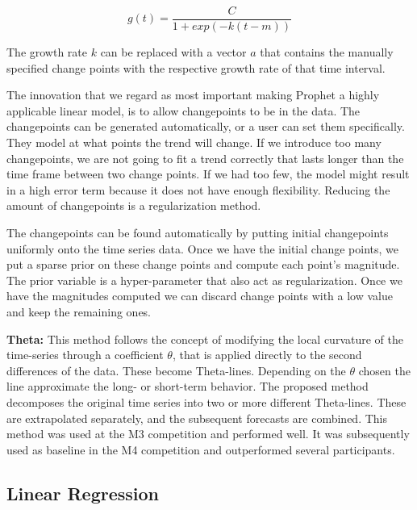 \begin{equation}
    g(t)=\dfrac{C}{1+exp(-k(t-m))}
    \label{eq:simpleTrendModel}
\end{equation}

The growth rate $k$ can be replaced with a vector $a$ that contains the manually specified change points with the respective growth rate of that time interval.

The innovation that we regard as most important making Prophet a highly applicable linear model, is to allow changepoints to be in the data. The changepoints can be generated automatically, or a user can set them specifically. They model at what points the trend will change. If we introduce too many changepoints, we are not going to fit a trend correctly that lasts longer than the time frame between two change points. If we had too few, the model might result in a high error term because it does not have enough flexibility. Reducing the amount of changepoints is a regularization method.

The changepoints can be found automatically by putting initial changepoints uniformly onto the time series data. Once we have the initial change points, we put a sparse prior on these change points and compute each point's magnitude. The prior variable is a hyper-parameter that also act as regularization. Once we have the magnitudes computed we can discard change points with a low value and keep the remaining ones.

\textbf{Theta:} \cite{THETA} This method follows the concept of modifying the local curvature of the time-series through a coefficient $\theta$, that is applied directly to the second differences of the data. These become Theta-lines. Depending on the $\theta$ chosen the line approximate the long- or short-term behavior. The proposed method decomposes the original time series into two or more different Theta-lines. These are extrapolated separately, and the subsequent forecasts are combined. This method was used at the M3 competition and performed well. It was subsequently used as baseline in the M4 competition and outperformed several participants.

\subsection{Linear Regression}

